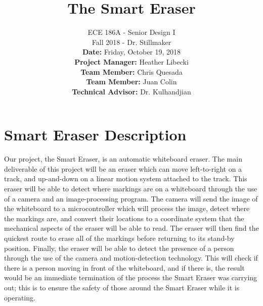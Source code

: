 \documentclass[10pt,onecolumn,draftcls]{IEEEtran} 					%
\title{\vspace{2in}The Smart Eraser}	%
\author{ECE 186A - Senior Design I \\ 			%
	Fall 2018 - Dr. Stillmaker \\ 				%
	\vspace{12pt} 								%
	\textbf{Date:} Friday, October 19, 2018  \\ 
	\vspace{2in}								%
	\vspace{6pt}
	\textbf{Project Manager:} Heather Libecki			%
	\vspace{12pt}
	\underline{\hspace{3in}}\\					%
	\textbf{Team Member:} Chris Quesada
	\vspace{12pt}
	\underline{\hspace{3in}}\\
	\textbf{Team Member:} Juan Colin
	\vspace{12pt}
	\underline{\hspace{3in}}\\
	\textbf{Technical Advisor:} Dr. Kulhandjian
	\underline{\hspace{3in}} \\
	\vspace{12in}}								%
\begin{document}
	\thispagestyle{empty}						%
	
	\maketitle									%
	
	
	\section{Smart Eraser Description}
	\setlength{\parindent}{5ex}
	Our project, the Smart Eraser, is an automatic whiteboard eraser. The main deliverable of this project will be an eraser which can move left-to-right on a track, and up-and-down on a linear motion system attached to the track. This eraser will be able to detect where markings are on a whiteboard through the use of a camera and an image-processing program. The camera will send the image of the whiteboard to a microcontroller which will process the image, detect where the markings are, and convert their locations to a coordinate system that the mechanical aspects of the eraser will be able to read. The eraser will then find the quickest route to erase all of the markings before returning to its stand-by position. Finally, the eraser will be able to detect the presence of a person through the use of the camera and motion-detection technology. This will check if there is a person moving in front of the whiteboard, and if there is, the result would be an immediate termination of the process the Smart Eraser was carrying out; this is to ensure the safety of those around the Smart Eraser while it is operating. 
	
\end{document}
